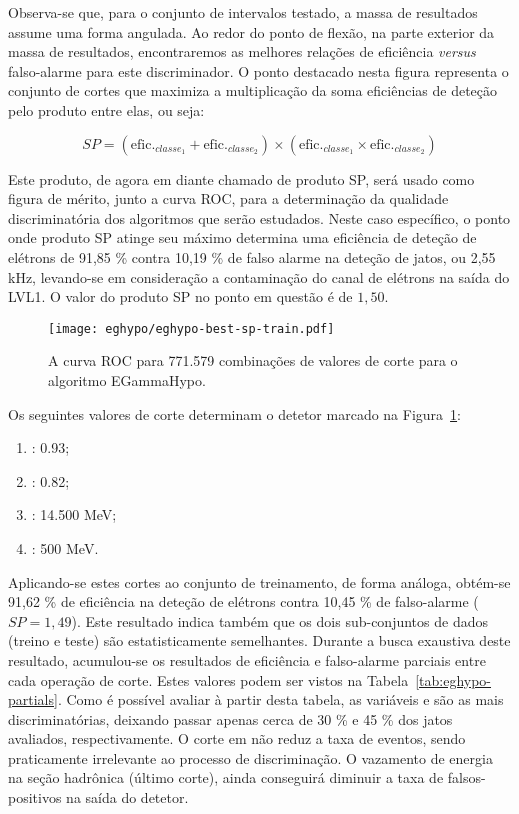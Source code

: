 Observa-se que, para o conjunto de intervalos testado, a massa de resultados
assume uma forma angulada. Ao redor do ponto de flexão, na parte exterior da
massa de resultados, encontraremos as melhores relações de eficiência
\textit{versus} falso-alarme para este discriminador. O ponto destacado nesta
figura representa o conjunto de cortes que maximiza a multiplicação da soma
eficiências de deteção pelo produto entre elas, ou seja:

\begin{equation}
SP = (\text{efic.}_{classe_1} + \text{efic.}_{classe_2}) \times (\text{efic.}_{classe_1} \times \text{efic.}_{classe_2})
\end{equation}

Este produto, de agora em diante chamado de produto SP, será usado como figura
de mérito, junto a curva ROC, para a determinação da qualidade discriminatória
dos algoritmos que serão estudados. Neste caso específico, o ponto onde
produto SP atinge seu máximo determina uma eficiência de deteção de elétrons
de 91,85 \% contra 10,19 \% de falso alarme na deteção de jatos, ou 2,55 kHz,
levando-se em consideração a contaminação do canal de elétrons na saída do
LVL1. O valor do produto SP no ponto em questão é de $1,50$.

\begin{figure}
\begin{center}
\texttt{[image: eghypo/eghypo-best-sp-train.pdf]}
\end{center}
\caption{A curva ROC para 771.579 combinações de valores de corte para o
algoritmo EGammaHypo.}
\label{fig:eghypo-best-sp-train}
\end{figure}

Os seguintes valores de corte determinam o detetor marcado na
Figura~\ref{fig:eghypo-best-sp-train}:
\begin{enumerate}
\item \rcore: 0.93;
\item \eratio: 0.82;
\item \etem: 14.500 MeV;
\item \ethad: 500 MeV.
\end{enumerate}

Aplicando-se estes cortes ao conjunto de treinamento, de forma análoga,
obtém-se 91,62 \% de eficiência na deteção de elétrons contra 10,45 \% de
falso-alarme ($SP = 1,49$). Este resultado indica também que os dois
sub-conjuntos de dados (treino e teste) são estatisticamente
semelhantes. Durante a busca exaustiva deste resultado, acumulou-se os
resultados de eficiência e falso-alarme parciais entre cada operação de
corte. Estes valores podem ser vistos na
Tabela~\ref{tab:eghypo-partials}. Como é possível avaliar à partir desta
tabela, as variáveis \rcore e \eratio são as mais discriminatórias, deixando
passar apenas cerca de 30 \% e 45 \% dos jatos avaliados, respectivamente. O
corte em \etem não reduz a taxa de eventos, sendo praticamente irrelevante ao
processo de discriminação. O vazamento de energia na seção hadrônica (último
corte), ainda conseguirá diminuir a taxa de falsos-positivos na saída do
detetor.

